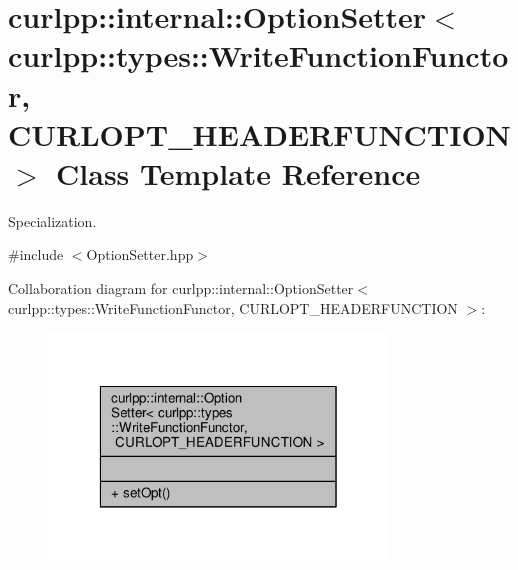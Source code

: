 \hypertarget{classcurlpp_1_1internal_1_1OptionSetter_3_01curlpp_1_1types_1_1WriteFunctionFunctor_00_01CURLOPT__HEADERFUNCTION_01_4}{\section{curlpp\-:\-:internal\-:\-:Option\-Setter$<$ curlpp\-:\-:types\-:\-:Write\-Function\-Functor, C\-U\-R\-L\-O\-P\-T\-\_\-\-H\-E\-A\-D\-E\-R\-F\-U\-N\-C\-T\-I\-O\-N $>$ Class Template Reference}
\label{classcurlpp_1_1internal_1_1OptionSetter_3_01curlpp_1_1types_1_1WriteFunctionFunctor_00_01CURLOPT__HEADERFUNCTION_01_4}
}


Specialization.  




{\ttfamily \#include $<$Option\-Setter.\-hpp$>$}



Collaboration diagram for curlpp\-:\-:internal\-:\-:Option\-Setter$<$ curlpp\-:\-:types\-:\-:Write\-Function\-Functor, C\-U\-R\-L\-O\-P\-T\-\_\-\-H\-E\-A\-D\-E\-R\-F\-U\-N\-C\-T\-I\-O\-N $>$\-:
\nopagebreak
\begin{figure}[H]
\begin{center}
\leavevmode
\includegraphics[width=256pt]{classcurlpp_1_1internal_1_1OptionSetter_3_01curlpp_1_1types_1_1WriteFunctionFunctor_00_01CURLOPT26dd90c768e791a15105458418f9e1e7}
\end{center}
\end{figure}
